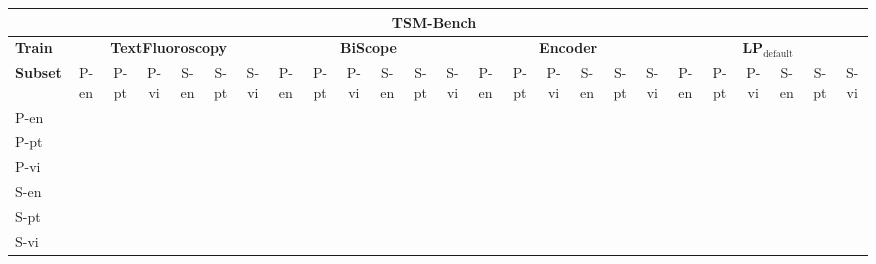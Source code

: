 \noindent
\begin{tabular}{lcccccccccccccccccccccccc}
\toprule
\multicolumn{25}{c}{\textbf{TSM-Bench~\citep{quaremba2026tsm}}} \\
\midrule
\textbf{Train}  & \multicolumn{6}{c}{\textbf{TextFluoroscopy}} & \multicolumn{6}{c}{\textbf{BiScope}} & \multicolumn{6}{c}{\textbf{Encoder}} & \multicolumn{6}{c}{\textbf{LP$_{\mathrm{default}}$}} \\
\cmidrule(lr){2-7}\cmidrule(lr){8-13}\cmidrule(lr){14-19}\cmidrule(lr){20-25}
\textbf{Subset} & P-en & P-pt & P-vi & S-en & S-pt & S-vi & P-en & P-pt & P-vi & S-en & S-pt & S-vi & P-en & P-pt & P-vi & S-en & S-pt & S-vi & P-en & P-pt & P-vi & S-en & S-pt & S-vi \\
\midrule
P-en &  &  &  &  &  &  &  &  &  &  &  &  &  &  &  &  &  &  &  &  &  &  &  &  \\
P-pt &  &  &  &  &  &  &  &  &  &  &  &  &  &  &  &  &  &  &  &  &  &  &  &  \\
P-vi &  &  &  &  &  &  &  &  &  &  &  &  &  &  &  &  &  &  &  &  &  &  &  &  \\
S-en &  &  &  &  &  &  &  &  &  &  &  &  &  &  &  &  &  &  &  &  &  &  &  &  \\
S-pt &  &  &  &  &  &  &  &  &  &  &  &  &  &  &  &  &  &  &  &  &  &  &  &  \\
S-vi &  &  &  &  &  &  &  &  &  &  &  &  &  &  &  &  &  &  &  &  &  &  &  &  \\
\bottomrule
\end{tabular}

